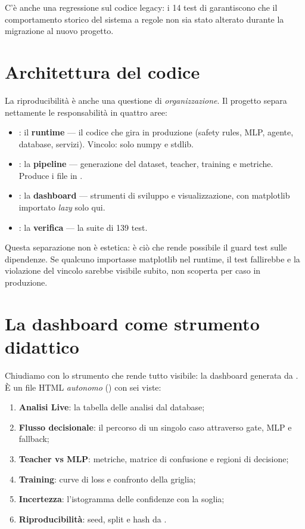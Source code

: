 C'è anche una regressione sul codice legacy: i 14 test di
 garantiscono che il
comportamento storico del sistema a regole non sia stato alterato durante
la migrazione al nuovo progetto.

\section{Architettura del codice}\label{sec:architettura-codice}

La riproducibilità è anche una questione di \emph{organizzazione}. Il
progetto separa nettamente le responsabilità in quattro aree:

\begin{itemize}
  \item {}: il \textbf{runtime} — il
        codice che gira in produzione (safety rules, MLP, agente, database,
        servizi). Vincolo: solo numpy e stdlib.
  \item {}: la \textbf{pipeline} — generazione del dataset,
        teacher, training e metriche. Produce i file in .
  \item {}: la \textbf{dashboard} — strumenti di sviluppo e
        visualizzazione, con matplotlib importato \emph{lazy} solo qui.
  \item {}: la \textbf{verifica} — la suite di 139 test.
\end{itemize}

Questa separazione non è estetica: è ciò che rende possibile il guard test
sulle dipendenze. Se qualcuno importasse matplotlib nel runtime, il test
fallirebbe e la violazione del vincolo sarebbe visibile subito, non scoperta
per caso in produzione.

\section{La dashboard come strumento didattico}\label{sec:dashboard}

Chiudiamo con lo strumento che rende tutto visibile: la dashboard generata
da . È un file HTML \emph{autonomo}
() con sei viste:

\begin{enumerate}
  \item \textbf{Analisi Live}: la tabella delle analisi dal database;
  \item \textbf{Flusso decisionale}: il percorso di un singolo caso
        attraverso gate, MLP e fallback;
  \item \textbf{Teacher vs MLP}: metriche, matrice di confusione e regioni
        di decisione;
  \item \textbf{Training}: curve di loss e confronto della griglia;
  \item \textbf{Incertezza}: l'istogramma delle confidenze con la soglia;
  \item \textbf{Riproducibilità}: seed, split e hash da
        .
\end{enumerate}

